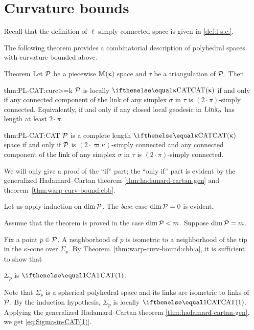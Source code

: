 \section{Curvature bounds}


Recall that the definition of $\ell$-simply connected space is 
given in \ref{def:l-s.c.}.

The following theorem provides a combinatorial description of polyhedral spaces with curvature bounded above.


\begin{thm}{Theorem}\label{thm:PL-CAT}
Let $\mathcal{P}$ be a piecewise
$\mathbb{M}_{{}}^{}({\upkappa})$ space and $\tau$ be a triangulation of $\mathcal{P}$. Then 

\begin{subthm}{thm:PL-CAT:curc>=k}
$\mathcal{P}$  is locally $\CAT\kappa$
if and only if any connected component of the link of any simplex $\sigma$ in $\tau$
is $(2\cdot\pi)$-simply connected.
Equivalently, if and only if any closed local geodesic in $\mathop{\rm Link}\nolimits_\upsigma$ has length at least $2\cdot\pi$.
\end{subthm}

\begin{subthm}{thm:PL-CAT:CAT}
$\mathcal{P}$ is a complete length $\CAT\kappa$ space
if and only if $\mathcal{P}$ is $(2\cdot\varpi\kappa)$-simply connected and any connected component of the link of any simplex $\sigma$ in $\tau$
is $(2\cdot\pi)$-simply connected.
\end{subthm}

\end{thm}


We will only give a proof of the ``if'' part;
the ``only if'' part is evident by the generalized Hadamard--Cartan theorem \ref{thm:hadamard-cartan-gen} and theorem~\ref{thm:warp-curv-bound:cbb}.

Let us apply induction on $\mathop{\rm dim}\nolimits\mathcal{P}$.
The  {}\emph{base}  case $\mathop{\rm dim}\nolimits\mathcal{P}=0$ is evident.

Assume that the theorem is proved in the case $\mathop{\rm dim}\nolimits\mathcal{P}<m$. Suppose  $\mathop{\rm dim}\nolimits\mathcal{P}=m$.

Fix a point $p\in\spc{P}$.
A neighborhood of $p$ 
is isometric to a neighborhood of the tip in the $\kappa$-cone over 
 $\Sigma_p$.
By Theorem~\ref{thm:warp-curv-bound:cbb:a}, 
it is sufficient to show that 
\begin{clm}{}\label{eq:Sigma-in-CAT(1)}
 $\Sigma_p$ is $\CAT1$.
\end{clm}

Note that $\Sigma_p$ is a spherical polyhedral space 
and its  links are isometric to  links of $\mathcal{P}$. 
By the  induction hypothesis, $\Sigma_p$ is locally $\CAT1$.
Applying the generalized Hadamard--Cartan theorem \ref{thm:hadamard-cartan-gen},
we get \ref{eq:Sigma-in-CAT(1)}.

